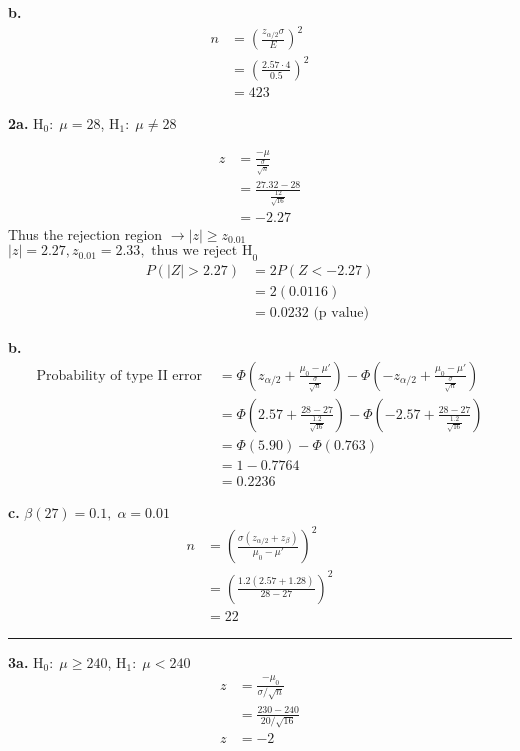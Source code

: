 \documentclass[12pt]{report}
\makeatletter
\newcommand*{\xbar}{}%
\DeclareRobustCommand*{\xbar}{%
	\mathpalette\@xbar{}%
}
\newcommand*{\@xbar}[2]{%
	\sbox0{$#1\mathrm{x}\m@th$}%
	\sbox2{$#1x\m@th$}%
	\rlap{%
		\hbox to\wd2{%
			\hfill
			$\overline{%
				\vrule width 0pt height\ht0 %
				\kern\wd0 %
			}$%
		}%
	}%
	\copy2 %
}
\newcommand{\sep}{\bigskip\hrule\bigskip}
\makeatother
\begin{document}
\noindent \textbf{b.} 
\begin{align*}
	n &= \left(\frac{z_{\alpha/2}\sigma}{E}\right)^2\\
	&= \left(\frac{2.57 \cdot 4}{0.5}\right)^2\\
	&= \boxed{423}
\end{align*}

\noindent \textbf{2a.} H$_0 : \; \mu = 28$, H$_1 : \; \mu \neq 28$

\begin{align*}
	z &= \frac{\xbar - \mu}{\frac{\sigma}{\sqrt{n}}}\\
	&= \frac{27.32 - 28}{\frac{12}{\sqrt{16}}}\\
	&= -2.27
\end{align*} 
Thus the rejection region $ \rightarrow |z| \geq z_{0.01}$\\
$|z| = 2.27, z_{0.01} = 2.33, \boxed{\text{ thus we reject H}_0}$\\

\begin{align*}
	P(|Z| > 2.27) &= 2P(Z < -2.27)\\
	&= 2(0.0116)\\
	&= \boxed{0.0232} \text{ (p value)}
\end{align*}

\pagebreak
\noindent \textbf{b.} 
\begin{align*}
	\text{Probability of type II error } &= \Phi\left(z_{\alpha/2} + \frac{\mu_0 - \mu'}{\frac{\sigma}{\sqrt{n}}}\right)-\Phi\left(-z_{\alpha/2} + \frac{\mu_0 - \mu'}{\frac{\sigma}{\sqrt{n}}}\right)\\
	&= \Phi\left(2.57 + \frac{28 - 27}{\frac{1.2}{\sqrt{16}}}\right)-\Phi\left(-2.57 + \frac{28 - 27}{\frac{1.2}{\sqrt{16}}}\right)\\
	&= \Phi(5.90) - \Phi(0.763)\\
	&= 1 - 0.7764\\
	&= \boxed{0.2236}
\end{align*}

\noindent \textbf{c.} $\beta(27) = 0.1,\;\alpha = 0.01$
\begin{align*}
	n &= \left(\frac{\sigma(z_{\alpha/2} + z_\beta)}{\mu_0 - \mu'}\right)^2\\
	&= \left(\frac{1.2(2.57 + 1.28)}{28 - 27}\right)^2\\
	&= \boxed{22}
\end{align*}

\sep

\noindent \textbf{3a.} H$_0 : \; \mu \geq 240$, H$_1 : \; \mu < 240$
\begin{align*}
	z &= \frac{\xbar - \mu_0}{\sigma / \sqrt{n}}\\
	&= \frac{230-240}{20/\sqrt{16}}\\
	z &= -2
\end{align*}
\end{document}
